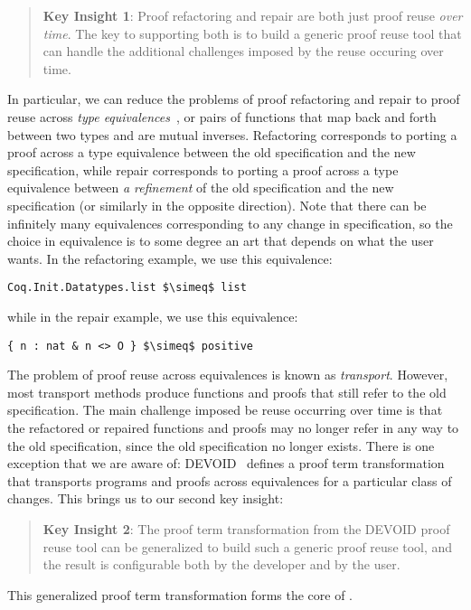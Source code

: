 \begin{quote}
\textbf{Key Insight 1}:
Proof refactoring and repair are both just 
proof reuse %
\textit{over time}. The key to supporting both is to build a generic proof reuse
tool that can handle the additional challenges imposed by the reuse occuring over time. 
\end{quote}
In particular, we can reduce the problems of proof refactoring and repair to proof reuse across \textit{type equivalences}~\cite{univalent2013homotopy},
or pairs of functions that map back and forth between two types and are mutual inverses.
Refactoring corresponds to porting a proof across a type equivalence between the old specification and the new specification,
while repair corresponds to porting a proof across a type equivalence between \textit{a refinement} of the old specification
and the new specification (or similarly in the opposite direction).
Note that there can be infinitely many equivalences corresponding to any change in specification,
so the choice in equivalence is to some degree an art that depends on what the user wants.
In the refactoring example, we use this equivalence:

\begin{lstlisting}
Coq.Init.Datatypes.list $\simeq$ list
\end{lstlisting}
while in the repair example, we use this equivalence:

\begin{lstlisting}
{ n : nat & n <> O } $\simeq$ positive
\end{lstlisting}

The problem of proof reuse across equivalences is known as \textit{transport}. %
However, most transport methods %
produce functions and proofs that still refer to the old specification.
The main challenge imposed be reuse occurring over time is that the refactored or repaired functions and proofs
may no longer refer in any way to the old specification, since the old specification no longer exists.
There is one exception that we are aware of: \textsc{DEVOID}~\cite{Ringer2019} defines a proof term transformation
that transports programs and proofs across equivalences for a particular class of changes.
This brings us to our second key insight:

\begin{quote}
\textbf{Key Insight 2}:
The proof term transformation from the \textsc{DEVOID} proof reuse tool can be generalized
to build such a generic proof reuse tool, and the result is configurable both by the developer and by the user.
\end{quote}
This generalized proof term transformation forms the core of \toolname.

